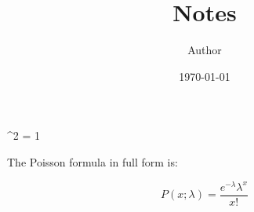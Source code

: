 \documentclass[12pt]{article}
\title{Notes}
\author{Author}
\date{\today}
\begin{document}
\maketitle

\lambda^2 = 1

The Poisson formula in full form is:

\begin{equation}
P(x;\lambda) = \frac{e^{-\lambda} \lambda^x}{x!}
\end{equation}
\end{document}
